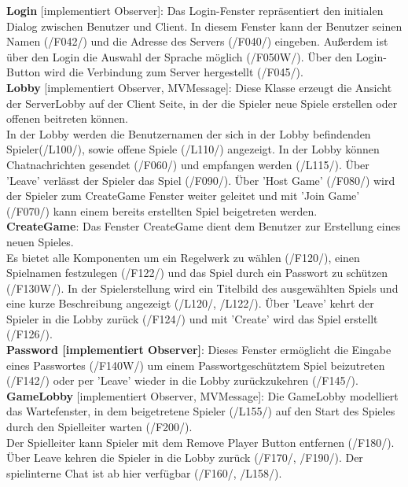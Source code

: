 \documentclass{article}
\begin{document}
\textbf{Login} [implementiert Observer]: Das Login-Fenster repräsentiert den initialen Dialog zwischen Benutzer und Client.
In diesem Fenster kann der Benutzer seinen Namen (/F042/) und die Adresse des Servers (/F040/) eingeben. Außerdem ist über den Login die Auswahl der Sprache möglich (/F050W/). Über den Login-Button wird die Verbindung zum Server hergestellt (/F045/).\\

\textbf{Lobby} [implementiert Observer, MVMessage]: Diese Klasse erzeugt die Ansicht der ServerLobby auf der Client Seite, in der die Spieler neue Spiele erstellen oder offenen beitreten können.\\
In der Lobby werden die Benutzernamen der sich in der Lobby befindenden Spieler(/L100/), sowie offene Spiele (/L110/) angezeigt. In der Lobby können Chatnachrichten gesendet (/F060/) und empfangen werden (/L115/). Über 'Leave' verlässt der Spieler das Spiel (/F090/). Über 'Host Game' (/F080/) wird der Spieler zum CreateGame Fenster weiter geleitet und mit 'Join Game' (/F070/) kann einem bereits erstellten Spiel beigetreten werden. \\

\textbf{CreateGame}: Das Fenster CreateGame dient dem Benutzer zur Erstellung eines neuen Spieles.\\
Es bietet alle Komponenten um ein Regelwerk zu wählen (/F120/), einen Spielnamen festzulegen (/F122/) und das Spiel durch ein Passwort zu schützen (/F130W/). In der Spielerstellung wird ein Titelbild des ausgewählten Spiels und eine kurze Beschreibung angezeigt (/L120/, /L122/). Über 'Leave' kehrt der Spieler in die Lobby zurück (/F124/) und mit 'Create' wird das Spiel erstellt (/F126/).\\

\textbf{Password [implementiert Observer]}: Dieses Fenster ermöglicht die Eingabe eines Passwortes (/F140W/) um einem Passwortgeschütztem Spiel beizutreten (/F142/) oder per 'Leave' wieder in die Lobby zurückzukehren (/F145/). \\

\textbf{GameLobby} [implementiert Observer, MVMessage]: Die GameLobby modelliert das Wartefenster, in dem beigetretene Spieler (/L155/) auf den Start des Spieles durch den Spielleiter warten (/F200/).\\
 Der Spielleiter kann Spieler mit dem Remove Player Button entfernen (/F180/). Über Leave kehren die Spieler in die Lobby zurück (/F170/, /F190/). Der spielinterne Chat ist ab hier verfügbar (/F160/, /L158/). \\
\end{document}

